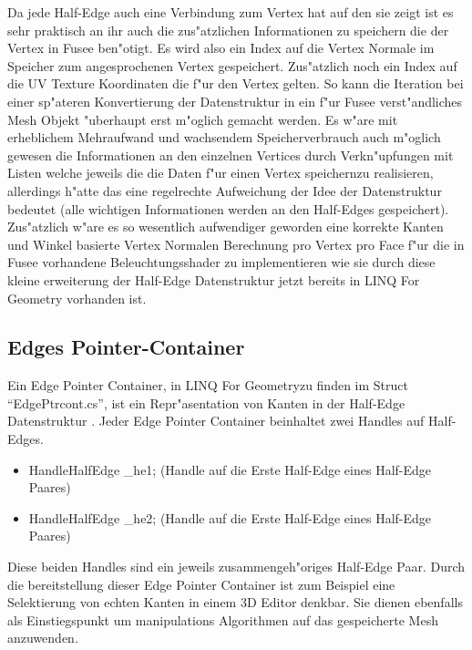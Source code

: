 \documentclass[pagesize, paper=a4, fontsize=12pt,titlepage=true, headings=small, headnosepline, abstractoff, liststotoc, nochapterprefix, plainheadsepline]{scrreprt}
\newcommand{\LFG}{LINQ For Geometry}
\newcommand{\LFGS}{LINQ For Geometry }
\newcommand{\HES}{Half-Edge Datenstruktur }
\begin{document}
Da jede Half-Edge auch eine Verbindung zum Vertex hat auf den sie zeigt ist es sehr praktisch an ihr auch die zus"atzlichen Informationen zu speichern die der Vertex in Fusee ben"otigt. Es wird also ein Index auf die Vertex Normale im Speicher zum angesprochenen Vertex gespeichert. Zus"atzlich noch ein Index auf die UV Texture Koordinaten die f"ur den Vertex gelten. So kann die Iteration bei einer sp"ateren Konvertierung der Datenstruktur in ein f"ur Fusee verst"andliches Mesh Objekt "uberhaupt erst m"oglich gemacht werden. Es w"are mit erheblichem Mehraufwand und wachsendem Speicherverbrauch auch m"oglich gewesen die Informationen an den einzelnen Vertices durch Verkn"upfungen mit Listen welche jeweils die die Daten f"ur einen Vertex speichernzu realisieren, allerdings h"atte das eine regelrechte Aufweichung der Idee der Datenstruktur bedeutet (alle wichtigen Informationen werden an den Half-Edges gespeichert). Zus"atzlich w"are es so wesentlich aufwendiger geworden eine korrekte Kanten und Winkel basierte Vertex Normalen Berechnung pro Vertex pro Face f"ur die in Fusee vorhandene Beleuchtungsshader zu implementieren wie sie durch diese kleine erweiterung der \HES jetzt bereits in \LFGS vorhanden ist.
		\subsection {Edges Pointer-Container}
			Ein Edge Pointer Container, in \LFG zu finden im Struct "`EdgePtrcont.cs"', ist ein Repr"asentation von Kanten in der \HES. Jeder Edge Pointer Container beinhaltet zwei Handles auf Half-Edges.
\begin{itemize}
\item HandleHalfEdge \_he1; (Handle auf die Erste Half-Edge eines Half-Edge Paares)
\item HandleHalfEdge \_he2; (Handle auf die Erste Half-Edge eines Half-Edge Paares)
\end{itemize}
Diese beiden Handles sind ein jeweils zusammengeh"origes Half-Edge Paar. Durch die bereitstellung dieser Edge Pointer Container ist zum Beispiel eine Selektierung von echten Kanten in einem 3D Editor denkbar. Sie dienen ebenfalls als Einstiegspunkt um manipulations Algorithmen auf das gespeicherte Mesh anzuwenden.
\end{document}
